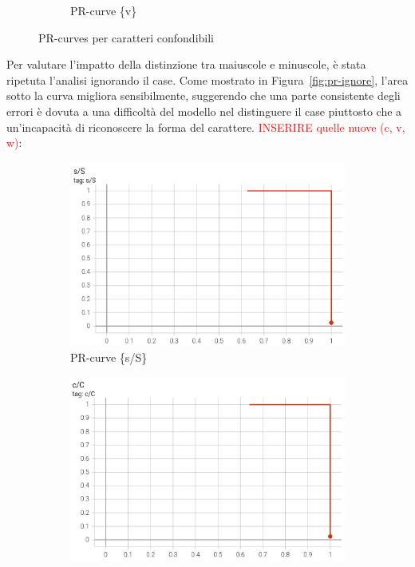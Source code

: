 \begin{figure}[htbp]
\begin{subfigure}[t]{0.32\textwidth}
        \caption{PR-curve \{v\}}
    \end{subfigure}
    \caption{PR-curves per caratteri confondibili}
    \label{fig:pr-confondibili}
\end{figure}

Per valutare l'impatto della distinzione tra maiuscole e minuscole, è stata ripetuta l'analisi ignorando il case. Come mostrato in Figura~\ref{fig:pr-ignore}, l'area sotto la curva migliora sensibilmente, suggerendo che una parte consistente degli errori è dovuta a una difficoltà del modello nel distinguere il case piuttosto che a un'incapacità di riconoscere la forma del carattere.
\textcolor{red}{INSERIRE quelle nuove (c, v, w)}:
\begin{figure}[htbp]
    \centering
    \begin{subfigure}[t]{0.32\textwidth}
        \centering
        \includegraphics[width=\textwidth]{images/pr_ignore1.png}
        \caption{PR-curve \{s/S\}}
    \end{subfigure}
    \begin{subfigure}[t]{0.32\textwidth}
        \centering
        \includegraphics[width=\textwidth]{images/pr_ignore2.png}

\end{subfigure}
\end{figure}
